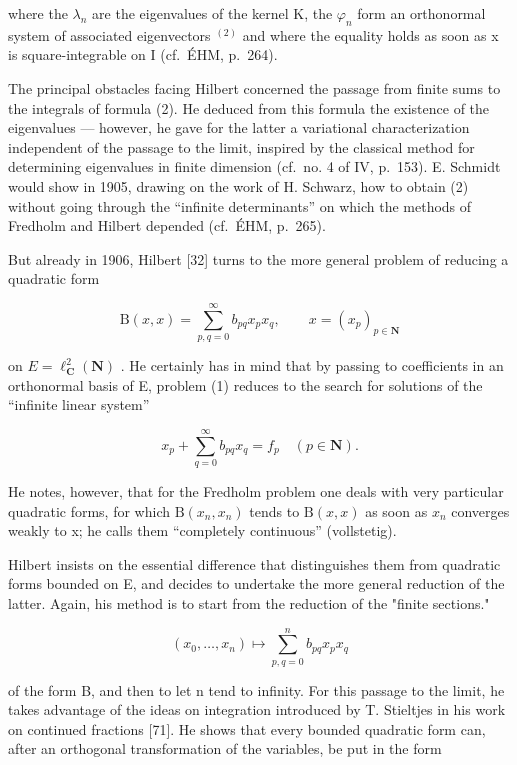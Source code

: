 where the \(\lambda_{n}\) are the eigenvalues of the kernel K, the \(\varphi_{n}\) form an orthonormal system of associated eigenvectors \(^{(2)}\) and where the equality holds as soon as x is square-integrable on I (cf.~ÉHM, p.~264).

The principal obstacles facing Hilbert concerned the passage from finite sums to the integrals of formula (2). He deduced from this formula the existence of the eigenvalues — however, he gave for the latter a variational characterization independent of the passage to the limit, inspired by the classical method for determining eigenvalues in finite dimension (cf.~no. 4 of IV, p.~153). E. Schmidt would show in 1905, drawing on the work of H. Schwarz, how to obtain (2) without going through the “infinite determinants” on which the methods of Fredholm and Hilbert depended (cf.~ÉHM, p.~265).

But already in 1906, Hilbert [32] turns to the more general problem of reducing a quadratic form

\[
\mathrm{B} (x, x) = \sum_ {p, q = 0} ^ {\infty} b _ {p q} x _ {p} x _ {q}, \qquad x = (x _ {p}) _ {p \in \mathbf {N}}
\]

on \(E = \ell_{\mathbf{C}}^{2}(\mathbf{N})\) . He certainly has in mind that by passing to coefficients in an orthonormal basis of E, problem (1) reduces to the search for solutions of the “infinite linear system”

\[
x _ {p} + \sum_ {q = 0} ^ {\infty} b _ {p q} x _ {q} = f _ {p} \quad (p \in \mathbf {N}).
\]

He notes, however, that for the Fredholm problem one deals with very particular quadratic forms, for which \(\mathrm{B}(x_{n}, x_{n})\) tends to \(\mathrm{B}(x, x)\) as soon as \(x_{n}\) converges weakly to x; he calls them “completely continuous” (vollstetig).

Hilbert insists on the essential difference that distinguishes them from quadratic forms bounded on E, and decides to undertake the more general reduction of the latter. Again, his method is to start from the reduction of the "finite sections."

\[
(x _ {0}, \ldots , x _ {n}) \mapsto \sum_ {p, q = 0} ^ {n} b _ {p q} x _ {p} x _ {q}
\]

of the form B, and then to let n tend to infinity. For this passage to the limit, he takes advantage of the ideas on integration introduced by T. Stieltjes in his work on continued fractions [71]. He shows that every bounded quadratic form can, after an orthogonal transformation of the variables, be put in the form

